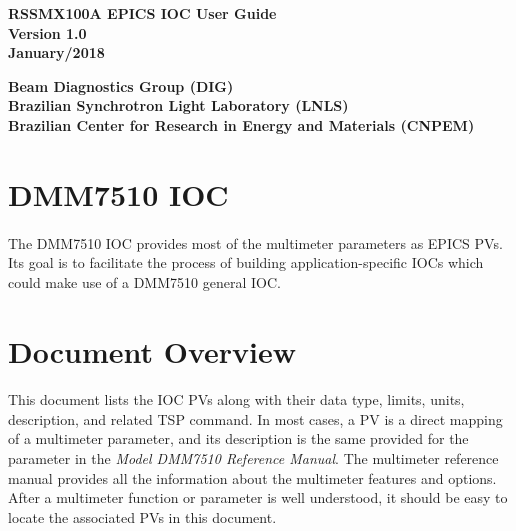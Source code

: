 \documentclass[openany]{article}
\begin{document}
\begin{titlepage}


\begin{center}

\vspace*{\fill}
\textbf{\Huge RSSMX100A EPICS IOC User Guide}\\[20pt]
\textbf{\Huge Version 1.0}\\[20pt]
\textbf{\Huge January/2018}
\vspace*{\fill}

\vfill
\textbf{Beam Diagnostics Group (DIG)}\\[5pt]
\textbf{Brazilian Synchrotron Light Laboratory (LNLS)}\\[5pt]
\textbf{Brazilian Center for Research in Energy and Materials (CNPEM)}
\end{center}

\end{titlepage}

\newpage
\pagestyle{plain} %

\tableofcontents

\newpage
\section{DMM7510 IOC}

	\paragraph{} The DMM7510 IOC provides most of the multimeter parameters as EPICS PVs. Its goal is to facilitate the process of building application-specific IOCs which could make use of a DMM7510 general IOC.

\section{Document Overview}

	\paragraph{} This document lists the IOC PVs along with their data type, limits, units, description, and related TSP command. In most cases, a PV is a direct mapping of a multimeter parameter, and its description is the same provided for the parameter in the \emph{Model DMM7510 Reference Manual}. The multimeter reference manual provides all the information about the multimeter features and options. After a multimeter function or parameter is well understood, it should be easy to locate the associated PVs in this document.
\end{document}
